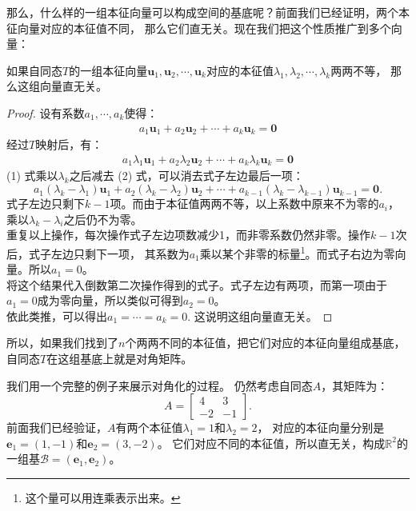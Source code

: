\documentclass[12pt,UTF8]{ctexbook}
\begin{document}
那么，什么样的一组本征向量可以构成空间的基底呢？前面我们已经证明，两个本征向量对应的本征值不同，
那么它们直无关。现在我们把这个性质推广到多个向量：
\begin{pp}\label{pp:6_2}
    如果自同态$T$的一组本征向量$\mathbf{u}_1, \mathbf{u}_2, \cdots, \mathbf{u}_k$对应的本征值$\lambda_1, \lambda_2, \cdots, \lambda_k$两两不等，
    那么这组向量直无关。
\end{pp}
\begin{proof} %
    设有系数$a_1, \cdots, a_k$使得：
    \begin{align*}
         a_1 \mathbf{u}_1 + a_2 \mathbf{u}_2 + \cdots + a_k \mathbf{u}_k = \mathbf{0}\tag{1}
    \end{align*}
    经过$T$映射后，有：
    \begin{align*} 
        a_1 \lambda_1\mathbf{u}_1 + a_2 \lambda_2 \mathbf{u}_2 + \cdots + a_k \lambda_k \mathbf{u}_k = \mathbf{0}\tag{2}
    \end{align*}
    (1) 式乘以$\lambda_k$之后减去 (2) 式，可以消去式子左边最后一项：
    $$ a_1 (\lambda_k - \lambda_1)\mathbf{u}_1 + a_2 (\lambda_k - \lambda_2) \mathbf{u}_2 + \cdots + a_{k-1} (\lambda_k - \lambda_{k-1}) \mathbf{u}_{k-1} = \mathbf{0}.$$
    式子左边只剩下$k-1$项。而由于本征值两两不等，以上系数中原来不为零的$a_i$，乘以$\lambda_k - \lambda_i$之后仍不为零。\\
    重复以上操作，每次操作式子左边项数减少1，而非零系数仍然非零。操作$k-1$次后，式子左边只剩下一项，
    其系数为$a_1$乘以某个非零的标量\footnote{这个量可以用连乘表示出来。}。而式子右边为零向量。所以$a_1 = 0$。\\
    将这个结果代入倒数第二次操作得到的式子。式子左边有两项，而第一项由于$a_1=0$成为零向量，所以类似可得到$a_2 = 0$。\\
    依此类推，可以得出$a_1 = \cdots = a_k = 0.$ 这说明这组向量直无关。 
    
\end{proof}

所以，如果我们找到了$n$个两两不同的本征值，把它们对应的本征向量组成基底，自同态$T$在这组基底上就是对角矩阵。

我们用一个完整的例子来展示对角化的过程。
仍然考虑自同态$A$，其矩阵为：
$$
A = \begin{bmatrix} 4 & 3 \\ -2 & -1 \end{bmatrix}.
$$
前面我们已经验证，$A$有两个本征值$\lambda_1 = 1$和$\lambda_2 = 2$，
对应的本征向量分别是$\mathbf{e}_1 = (1,-1)$和$\mathbf{e}_2 = (3,-2)$。
它们对应不同的本征值，所以直无关，构成$\mathbb{R}^2$的一组基$\mathcal{B} = (\mathbf{e}_1, \mathbf{e}_2)$。
\end{document}
